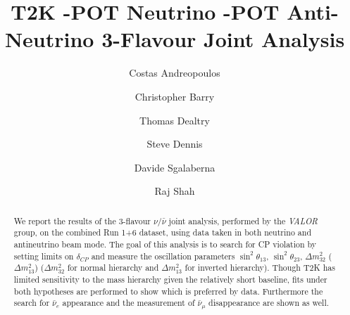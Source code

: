 %
%

\begin{frontmatter}

\title{
  T2K \TotalPotNu-POT Neutrino  \TotalPotNuBar-POT Anti-Neutrino 3-Flavour Joint Analysis
}

\vspace*{0.7cm}

\author[RAL,LIV]  {Costas Andreopoulos}
\author[LIV]  {Christopher Barry}
\author[LANCS]  {Thomas Dealtry}
\author[RAL,WAR]  {Steve Dennis\\}
\author[GEN]     {Davide Sgalaberna}
\author[RAL,OXF]  {Raj Shah}

\address[RAL]   {Science \& Technology Facilities Council (STFC), Rutherford Appleton Laboratory,\\ Harwell Oxford Campus, OX11 0QX, UK}
\address[LIV]   {University of Liverpool, Physics Department,\\ Liverpool, L69 7ZE, UK} 
\address[OXF]   {University of Oxford, Subdepartment of Particle Physics,\\ Oxford, OX1 3RH, UK}
\address[WAR]   {University of Warwick, Physics Department,\\ Coventry, CV4 7AL, UK}
\address[IFIC]  {CSIC and University of Valencia, Instituto de Fisica Corpuscular, \\ E-46071 Valencia, Spain}
\address[LANCS] {Lancaster University, Physics Department,\\ Lancaster, LA1 4YB, UK}
\address[GEN]  {University of Geneva, Departement de physique nucleaire et corpusculaire,\\ 1211 Geneve, Switzerland}

%
%

\begin{abstract}

We report the results of the
3-flavour $\nu/\bar{\nu}$ joint analysis, performed by the {\em VALOR} group,
on the combined Run 1+6 dataset, using data taken in both neutrino and antineutrino beam mode.
The goal of this analysis is 
to search for CP violation by setting limits on $\delta_{CP}$
and measure the oscillation parameters
$\sin^2 \theta_{13}$, $\sin^2 \theta_{23}$, $\Delta m^2_{32}$ ($\Delta m^2_{13}$) 
($\Delta m^2_{32}$ for normal hierarchy and $\Delta m^2_{13}$ for inverted hierarchy).
Though T2K has limited sensitivity to the mass hierarchy given the relatively short baseline,
fits under both hypotheses are performed to show which is preferred by data.
Furthermore the search for $\bar{\nu}_e$ appearance and 
the measurement of $\bar{\nu}_{\mu}$ disappearance are shown as well.


\end{abstract}
\end{frontmatter}
